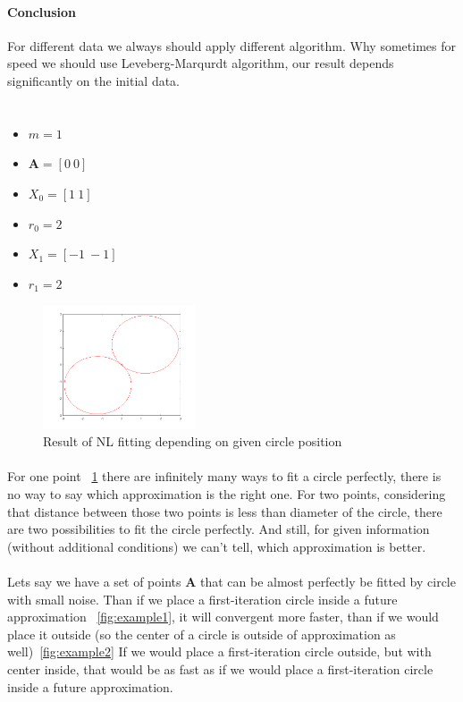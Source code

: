 \documentclass[]{scrartcl}
\begin{document}
\paragraph{Conclusion} 
For different data we always should apply different algorithm. Why sometimes for speed we should use Leveberg-Marqurdt algorithm, our result depends significantly on the initial data. 

\clearpage
\section{}
 \begin{itemize}
 	\item $m = 1$ 
 	\item $ \mathbf{A} = [0 \: 0] $
 	\item $ X_0 = [1 \: 1] $
 	\item $ r_0 = 2	$
 	\item $ X_1 = [-1 \: -1] $
 	\item $ r_1 = 2	$
 \end{itemize}
  \begin{figure}[h]
  	\centering
  	\includegraphics[width=0.4\textwidth]{1point_diff.png}
  	\caption{Result of NL fitting depending on given circle position}
  	\label{fig:1point_diff}
  \end{figure}
  \paragraph{}  For one point ~\ref{fig:1point_diff} there are  infinitely many ways to fit a circle perfectly, there is no way to say which approximation is the right one. For two points, considering that distance between those two points is less than diameter of the circle, there are two possibilities to fit the circle perfectly. And still, for given information (without additional conditions) we can't tell, which approximation is better. 
  \paragraph{} Lets say we have a set of points  $ \mathbf{A} $ that can be almost perfectly be fitted by circle with small noise. Than if we place a first-iteration circle inside a future approximation ~\ref{fig:example1}, it will convergent more faster, than if we would place it outside (so the center of a circle is outside of approximation as well)~\ref{fig:example2} If we would place a first-iteration circle outside, but with center inside, that would be as fast as if we would place a first-iteration circle inside a future approximation.
\end{document}
